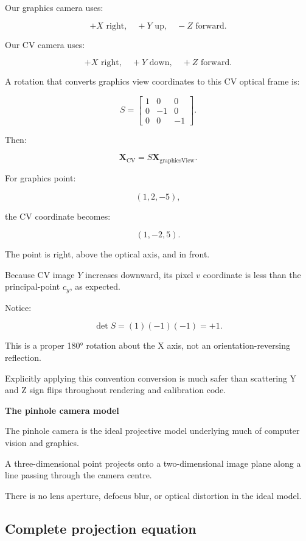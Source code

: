 \hypertarget{02-foundations-ii-ch035-coordinate-convention-mismatch-graphics-versus-cv}{}

Our graphics camera uses:

\[
 +X\text{ right},\quad+Y\text{ up},\quad-Z\text{ forward}.
\]

Our CV camera uses:

\[
 +X\text{ right},\quad+Y\text{ down},\quad+Z\text{ forward}.
\]

A rotation that converts graphics view coordinates to this CV optical frame is:

\[
 \boxed{ S= \begin{bmatrix} 1&0&0\\ 0&-1&0\\ 0&0&-1 \end{bmatrix} }.
\]

Then:

\[
 \boxed{ \mathbf X_{\mathrm{CV}}=S\mathbf X_{\mathrm{graphicsView}} }.
\]

For graphics point:

\[
 (1,2,-5),
\]

the CV coordinate becomes:

\[
 \boxed{(1,-2,5)}.
\]

The point is right, above the optical axis, and in front.

Because CV image \(Y\) increases downward, its pixel \(v\) coordinate is less than the principal-point \(c_y\), as expected.

Notice:

\[
 \det S=(1)(-1)(-1)=+1.
\]

This is a proper 180° rotation about the X axis, not an orientation-reversing reflection.

Explicitly applying this convention conversion is much safer than scattering Y and Z sign flips throughout rendering and calibration code.

\textbf{The pinhole camera model}

The pinhole camera is the ideal projective model underlying much of computer vision and graphics.

A three-dimensional point projects onto a two-dimensional image plane along a line passing through the camera centre.

There is no lens aperture, defocus blur, or optical distortion in the ideal model.

\subsection{Complete projection equation}\label{02-foundations-ii-ch035-complete-projection-equation}

